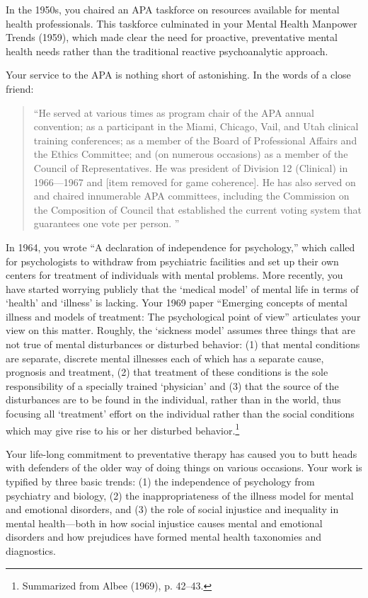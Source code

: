 In the 1950s, you chaired an APA taskforce on resources available for mental health professionals. This taskforce culminated in your Mental Health Manpower Trends (1959), which made clear the need for proactive, preventative mental health needs rather than the traditional reactive psychoanalytic approach.

Your service to the APA is nothing short of astonishing. In the words of a close friend:

\begin{quote}

``He served at various times as program chair of the APA annual convention; as a participant in the Miami, Chicago, Vail, and Utah clinical training conferences; as a member of the Board of Professional Affairs and the Ethics Committee; and (on numerous occasions) as a member of the Council of Representatives. He was president of Division 12 (Clinical) in 1966---1967 and [item removed for game coherence]. He has also served on and chaired innumerable APA committees, including the Commission on the Composition of Council that established the current voting system that guarantees one vote per person. ''
\end{quote}

In 1964, you wrote ``A declaration of independence for psychology,'' which called for psychologists to withdraw from psychiatric facilities and set up their own centers for treatment of individuals with mental problems. More recently, you have started worrying publicly that the `medical model' of mental life in terms of `health' and `illness' is lacking. Your 1969 paper ``Emerging concepts of mental illness and models of treatment: The psychological point of view'' articulates your view on this matter. Roughly, the `sickness model' assumes three things that are not true of mental disturbances or disturbed behavior: (1) that mental conditions are separate, discrete mental illnesses each of which has a separate cause, prognosis and treatment, (2) that treatment of these conditions is the sole responsibility of a specially trained `physician' and (3) that the source of the disturbances are to be found in the individual, rather than in the world, thus focusing all `treatment' effort on the individual rather than the social conditions which may give rise to his or her disturbed behavior.\footnote{Summarized from Albee (1969), p. 42--43.}

Your life-long commitment to preventative therapy has caused you to butt heads with defenders of the older way of doing things on various occasions. Your work is typified by three basic trends: (1) the independence of psychology from psychiatry and biology, (2) the inappropriateness of the illness model for mental and emotional disorders, and (3) the role of social injustice and inequality in mental health---both in how social injustice causes mental and emotional disorders and how prejudices have formed mental health taxonomies and diagnostics.

